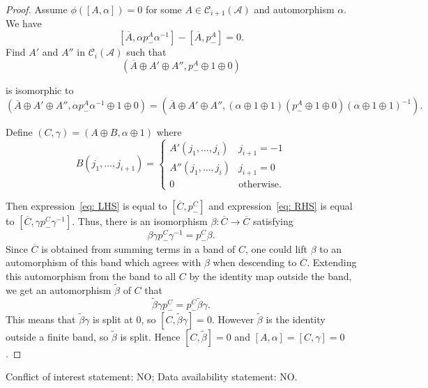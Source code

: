 \documentclass{article}
\theoremstyle{definition}
\newcommand{\CA}{{ \mathcal A}}
\def \al {\alpha}
\begin{document}
\begin{proof}

Assume \( \phi([A, \alpha]) = 0 \) for some $A\in \mathcal{C}_{i+1}(\CA)$ and automorphism $\alpha$. We have
\[
[\overline{A}, \alpha p^A_- \alpha^{-1}] - [\overline{A}, p^A_-] = 0.
\]
    Find \( A' \) and \( A'' \) in \( \mathcal{C}_i(\CA) \) such that
\begin{equation} \label{eq: LHS}
    (\overline{A} \oplus A' \oplus A'', p^A_- \oplus 1 \oplus 0)
\end{equation}

is isomorphic to
\begin{equation}\label{eq: RHS}
    (\overline{A} \oplus A' \oplus A'', \alpha p^A_- \alpha^{-1} \oplus 1 \oplus 0) = (\overline{A} \oplus A' \oplus A'', (\alpha \oplus 1 \oplus 1)(p^A_- \oplus 1 \oplus 0)(\alpha \oplus 1 \oplus 1)^{-1}).
\end{equation}

Define $ (C, \gamma)= (A \oplus B, \alpha \oplus 1) $ where
\[
B(j_1, \ldots, j_{i+1}) =
\begin{cases}
A'(j_1, \ldots, j_i ) & j_{i+1} = -1 \\
A''(j_1, \ldots, j_i ) & j_{i+1} = 0\\
0 & \text{otherwise}.
\end{cases}
\]

Then expression~\eqref{eq: LHS} is equal to $[\overline{C}, p_-^C]$ and expression~\eqref{eq: RHS} is equal to $[\overline{C}, \gamma p_-^C\gamma^{-1}]$. Thus, there is an isomorphism \( \beta : \overline{C} \to \overline{C} \) satisfying
$$
\beta \gamma p_-^C\gamma^{-1} = p^C_- \beta.
$$
Since $\overline{C}$ is obtained from summing terms in a band of $C$, one could lift $\beta$ to an automorphism of this band which agrees with $\beta$ when descending
to $\overline{C}.$ Extending this automorphism from the band to all $C$ by the identity map outside the band, we get an automorphism $\tilde \beta$ of $C$ that 
\[
\tilde\beta \gamma p^C_- = p^C_- \tilde\beta \gamma.
\]
This means that \( \tilde\beta \gamma \) is split at \( 0 \), so \( [C, \tilde\beta \gamma] = 0 \). However \( \tilde\beta \) is the identity outside a finite band, so \( \tilde\beta \) is split. Hence \( [C, \tilde\beta] = 0 \) and \( [A, \al]=[C, \gamma] = 0 \). 
\end{proof}
Conflict of interest statement: NO; Data availability statement: NO.
\printbibliography
\end{document}
